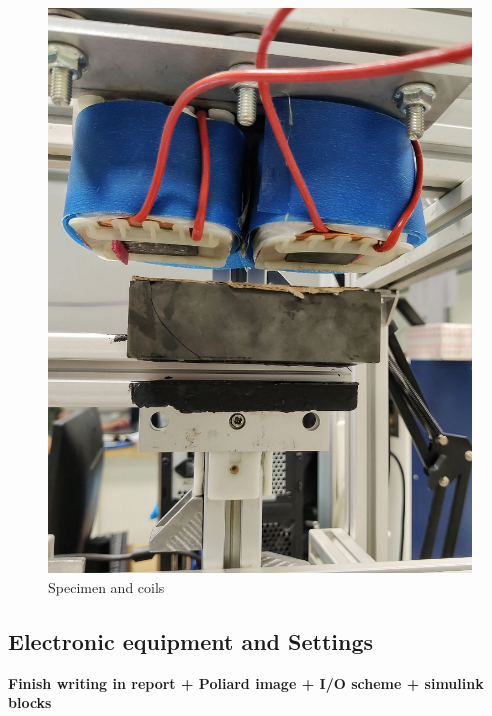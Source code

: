 \documentclass[a4paper, 11pt] {article}
\begin{document}
\begin{figure}
\begin{center}
\includegraphics[scale=0.2]{Images/1_magnete}
\end{center}
\caption{Specimen and coils}
\end{figure}


\subsection{Electronic equipment and Settings}

\textbf{Finish writing in report + Poliard image + I/O scheme + simulink blocks}
\end{document}
